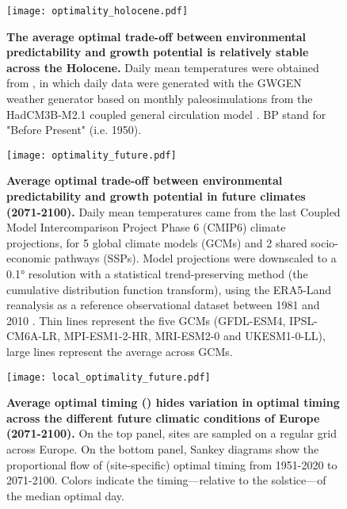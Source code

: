 \documentclass[11pt,letter]{article}
\begin{document}
\begin{figure}[h]
\hspace*{-1.2cm}
\texttt{[image: optimality\_holocene.pdf]}
\vspace*{-0.7cm}
\caption{\textbf{The average optimal trade-off between environmental predictability and growth potential is relatively stable across the Holocene.} Daily mean temperatures were obtained from \citet{VanderMeersch2024}, in which daily data were generated with the GWGEN weather generator \citep{Sommer2017} based on monthly paleosimulations from the HadCM3B-M2.1 coupled general circulation model \citep{Armstrong2019}. BP stand for "Before Present" (i.e. 1950).}
\label{fig:holocene}
\end{figure}


\vspace*{-0.7cm}
\begin{figure}[h]
\centering
\texttt{[image: optimality\_future.pdf]}
\vspace*{-0.5cm}
\caption{\textbf{Average optimal trade-off between environmental predictability and growth potential in future climates (2071-2100).} Daily mean temperatures came from the last Coupled Model Intercomparison Project Phase 6 (CMIP6) climate  projections, for 5 global climate models (GCMs) and 2 shared socio-economic pathways (SSPs). Model projections were downscaled to a 0.1° resolution with a statistical trend-preserving method (the cumulative distribution function transform), using the ERA5-Land reanalysis as a reference observational dataset between 1981 and 2010 \citep{Noel2022}. Thin lines represent the five GCMs (GFDL-ESM4, IPSL-CM6A-LR, MPI-ESM1-2-HR, MRI-ESM2-0 and UKESM1-0-LL), large lines represent the average across GCMs.}
\label{fig:future}
\vspace*{-10cm}
\end{figure}

\clearpage

\vspace*{-1.2cm}
\begin{figure}[h]
\centering
\texttt{[image: local\_optimality\_future.pdf]}
\vspace*{-0.4cm}
\caption{\textbf{Average optimal timing () hides variation in optimal timing across the different future climatic conditions of Europe (2071-2100).} On the top panel, sites are sampled on a regular grid across Europe. On the bottom panel, Sankey diagrams show the proportional flow of (site-specific) optimal timing from 1951-2020 to 2071-2100. Colors indicate the timing—relative to the solstice—of the median optimal day.}
\label{fig:futurelocal}
\end{figure}

{\footnotesize
\vspace*{0cm}
}
\end{document}
